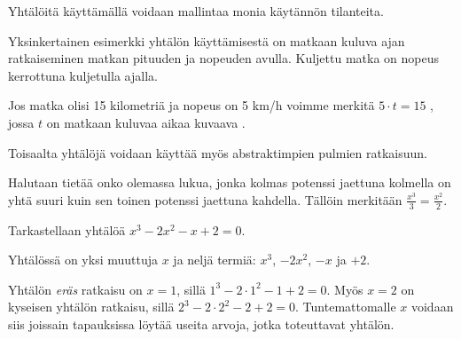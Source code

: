 



Yhtälöitä käyttämällä voidaan mallintaa monia käytännön tilanteita.

\begin{esimerkki}
	Yksinkertainen esimerkki yhtälön käyttämisestä on matkaan kuluva ajan ratkaiseminen matkan pituuden ja nopeuden avulla. Kuljettu matka on nopeus kerrottuna kuljetulla ajalla. 
	
	Jos matka olisi 15 kilometriä ja nopeus on 5 km/h voimme merkitä $5\cdot t=15$ , jossa $t$ on matkaan kuluvaa aikaa kuvaava .
\end{esimerkki}

Toisaalta yhtälöjä voidaan käyttää myös abstraktimpien pulmien ratkaisuun.

\begin{esimerkki}
	Halutaan tietää onko olemassa lukua, jonka kolmas potenssi jaettuna kolmella on yhtä suuri kuin sen toinen potenssi jaettuna kahdella. Tällöin merkitään $\frac{x^3}{3}=\frac{x^2}{2}$. 
\end{esimerkki}


\begin{esimerkki}
 Tarkastellaan yhtälöä $x^3-2x^2-x+2=0$. 
 
 Yhtälössä on yksi muuttuja $x$ ja neljä termiä: $x^3$, $-2x^2$, $-x$ ja $+2$.  
 
 Yhtälön \textit{eräs} ratkaisu on $x=1$, sillä $1^3-2\cdot{1^2}-1+2=0$. 
 Myös $x=2$ on kyseisen yhtälön ratkaisu, sillä $2^3-2\cdot{2^2}-2+2=0$. 
 Tuntemattomalle $x$ voidaan siis joissain tapauksissa löytää useita arvoja, jotka toteuttavat yhtälön. 
\end{esimerkki}


